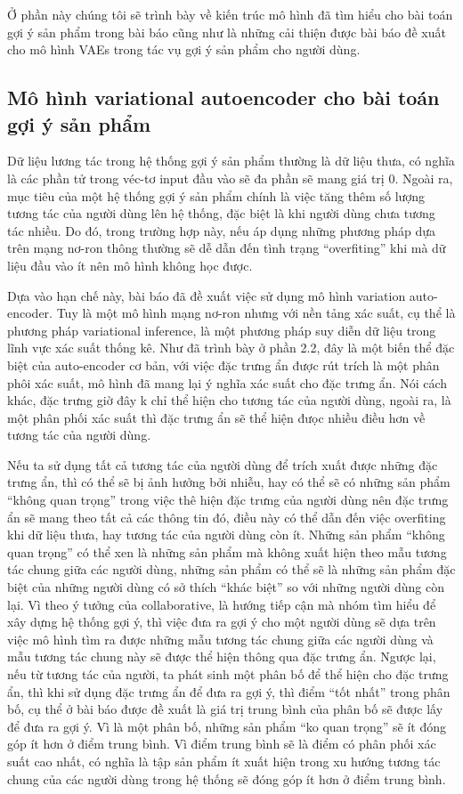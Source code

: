     Ở phần này chúng tôi sẽ trình bày về kiến trúc mô hình đã tìm hiểu cho bài toán gợi ý sản phẩm trong bài báo cũng như là những cải thiện được bài báo đề xuất cho mô hình VAEs trong tác vụ gợi ý sản phẩm cho người dùng. 

    \subsection{Mô hình variational autoencoder cho bài toán gợi ý sản phẩm}
    
    Dữ liệu lương tác trong hệ thống gợi ý sản phẩm thường là dữ liệu thưa, có nghĩa là các phần tử trong véc-tơ input đầu vào sẽ đa phần sẽ mang giá trị 0. 
    Ngoài ra, mục tiêu của một hệ thống gợi ý sản phẩm chính là việc tăng thêm số lượng tương tác của người dùng lên hệ thống, đặc biệt là khi người dùng chưa tương tác nhiều.
    Do đó, trong trường hợp này, nếu áp dụng những phương pháp dựa trên mạng nơ-ron thông thường sẽ dễ dẫn đến tình trạng ``overfiting'' khi mà dữ liệu đầu vào ít nên mô hình không học được.
    
    Dựa vào hạn chế này, bài báo đã đề xuất việc sử dụng mô hình variation auto-encoder. 
    Tuy là một mô hình mạng nơ-ron nhưng với nền tảng xác suất, cụ thể là phương pháp variational inference, là một phương pháp suy diễn dữ liệu trong lĩnh vực xác suất thống kê.
    Như đã trình bày ở phần 2.2, đây là một biến thể đặc biệt của auto-encoder cơ bản, với việc đặc trưng ẩn được rút trích là một phân phôi xác suất, mô hình đã mang lại ý nghĩa xác suất cho đặc trưng ẩn.
    Nói cách khác, đặc trưng giờ đây k chỉ thể hiện cho tương tác của người dùng, ngoài ra, là một phân phối xác suất thì đặc trưng ẩn sẽ thể hiện đưọc nhiều điều hơn về tương tác của người dùng.


    Nếu ta sử dụng tất cả tương tác của người dùng để trích xuất được những đặc trưng ẩn, thì có thể sẽ bị ảnh hưởng bởi nhiễu, hay có thể sẽ có những sản phẩm ``không quan trọng'' trong việc thê hiện đặc trưng của người dùng nên đặc trưng ẩn sẽ mang theo tất cả các thông tin đó, điều này có thể dẫn đến việc overfiting khi dữ liệu thưa, hay tương tác của người dùng còn ít.
    Những sản phẩm ``không quan trọng'' có thể xen là những sản phẩm mà không xuất hiện theo mẫu tương tác chung giữa các người dùng, những sản phẩm có thể sẽ là những sản phẩm đặc biệt của những người dùng có sở thích ``khác biệt'' so với những người dùng còn lại. 
    Vì theo ý tưởng của collaborative, là hướng tiếp cận mà nhóm tìm hiểu để xây dựng hệ thống gợi ý, thì việc đưa ra gợi ý cho một người dùng sẽ dựa trên việc mô hình tìm ra được những mẫu tương tác chung giữa các người dùng và mẫu tương tác chung này sẽ được thể hiện thông qua đặc trưng ẩn.
    Ngược lại, nếu từ tương tác của người, ta phát sinh một phân bố để thể hiện cho đặc trưng ẩn, thì khi sử dụng đặc trưng ẩn để đưa ra gợi ý, thì điểm ``tốt nhất'' trong phân bố, cụ thể ở bài báo được đề xuất là giá trị trung bình của phân bố sẽ được lấy để đưa ra gợi ý.
    Vì là một phân bố, những sản phẩm ``ko quan trọng'' sẽ ít đóng góp ít hơn ở điểm trung bình. Vì điểm trung bình sẽ là điểm có phân phối xác suất cao nhất, có nghĩa là tập sản phẩm ít xuất hiện trong xu hướng tương tác chung của các người dùng trong hệ thống sẽ đóng góp ít hơn ở điểm trung bình.     

